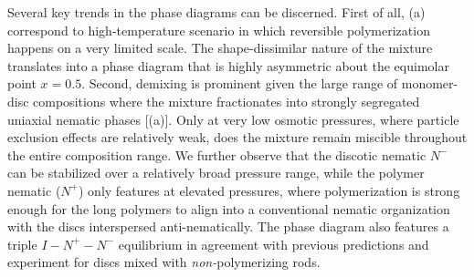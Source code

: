 Several key trends in the phase diagrams can be discerned. First of all, (a) correspond to high-temperature scenario in which reversible polymerization happens on a very limited scale. The shape-dissimilar nature of the mixture translates into a phase diagram that is highly asymmetric about the equimolar point $x=0.5$. Second, demixing is  prominent given the large range of monomer-disc compositions where the mixture fractionates into strongly segregated uniaxial nematic phases [(a)]. Only at very low osmotic pressures, where particle exclusion effects are relatively weak, does the mixture remain miscible throughout the entire composition range. We further observe that the discotic nematic $N^{-}$ can be stabilized over a relatively broad pressure range, while the polymer nematic ($N^{+}$)  only features at elevated pressures, where polymerization is strong enough for the long polymers to align into a conventional nematic organization with the discs interspersed anti-nematically. The phase diagram also features a triple $I-N^{+}-N^{-}$ equilibrium in agreement with previous predictions  \cite{galindo2,wensinkrodplate} and experiment \cite{kooijlangmuir2000,woolston2015} for discs mixed with {\em non-}polymerizing rods. 

